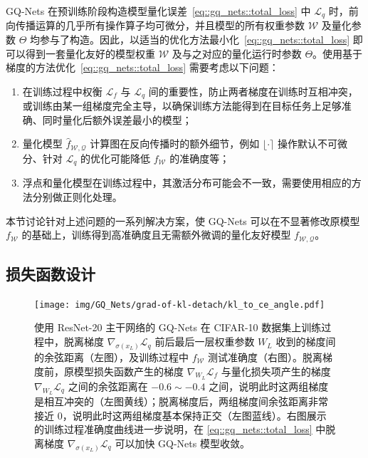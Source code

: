 \documentclass[
  fontset = mac,
]{shtthesis}
\providecommand{\FpNet}{f_{\mathcal{W}}}
\begin{document}
GQ-Nets 在预训练阶段构造模型量化误差~\eqref{eq::gq_nets::total_loss} 中 $\mathcal{L}_q$ 时，前向传播运算的几乎所有操作算子均可微分，并且模型的所有权重参数 $\mathcal{W}$ 及量化参数 $\Theta$ 均参与了构造。因此，以适当的优化方法最小化~\eqref{eq::gq_nets::total_loss} 即可以得到一套量化友好的模型权重 $\mathcal{W}$ 及与之对应的量化运行时参数 $\Theta$。使用基于梯度的方法优化~\eqref{eq::gq_nets::total_loss} 需要考虑以下问题：
\begin{enumerate}[1)]
  \item 在训练过程中权衡 $\mathcal{L}_f$ 与 $\mathcal{L}_q$ 间的重要性，防止两者梯度在训练时互相冲突，或训练由某一组梯度完全主导，以确保训练方法能得到在目标任务上足够准确、同时量化后额外误差最小的模型；
  \item 量化模型 $\hat{f}_{\mathcal{W, Q}}$ 计算图在反向传播时的额外细节，例如 $\lfloor\cdot\rceil$ 操作默认不可微分、针对 $\mathcal{L}_q$ 的优化可能降低 $f_{\mathcal{W}}$ 的准确度等；
  \item 浮点和量化模型在训练过程中，其激活分布可能会不一致，需要使用相应的方法分别做正则化处理。
\end{enumerate}
本节讨论针对上述问题的一系列解决方案，使 GQ-Nets 可以在不显著修改原模型 $f_{\mathcal{W}}$ 的基础上，训练得到高准确度且无需额外微调的量化友好模型 $f_{\mathcal{W, Q}}$。
\subsection{损失函数设计} \label{sec::gq_nets::loss_func}

\begin{figure}[htb]
  \centering
  \texttt{[image: img/GQ\_Nets/grad-of-kl-detach/kl\_to\_ce\_angle.pdf]}
  \caption{使用 ResNet-20 主干网络的 GQ-Nets 在 CIFAR-10 数据集上训练过程中，脱离梯度 $\nabla_{\sigma(x_L)}\mathcal{L}_q$ 前后最后一层权重参数 $W_L$ 收到的梯度间的余弦距离（左图），及训练过程中 $\FpNet$ 测试准确度（右图）。脱离梯度前，原模型损失函数产生的梯度 $\nabla_{W_L}\mathcal{L}_f$ 与量化损失项产生的梯度 $\nabla_{W_L}\mathcal{L}_q$ 之间的余弦距离在 $-0.6 \sim -0.4$ 之间，说明此时这两组梯度是相互冲突的（左图黄线）；脱离梯度后，两组梯度间余弦距离非常接近 0，说明此时这两组梯度基本保持正交（左图蓝线）。右图展示的训练过程准确度曲线进一步说明，在 \eqref{eq::gq_nets::total_loss} 中脱离梯度 $\nabla_{\sigma(x_L)}\mathcal{L}_q$ 可以加快 GQ-Nets 模型收敛。}
  \label{img::gq_nets::detach_grad_cos}
\end{figure}
\end{document}
